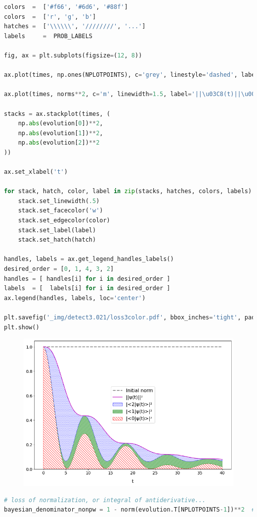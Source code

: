 \begin{lstlisting}[language=Python]
colors  =  ['#f66', '#6d6', '#88f']
colors  =  ['r', 'g', 'b']
hatches =  ['\\\\\\', '////////', '...']
labels     =  PROB_LABELS

fig, ax = plt.subplots(figsize=(12, 8))

ax.plot(times, np.ones(NPLOTPOINTS), c='grey', linestyle='dashed', label='Initial norm', linewidth=2.5)

ax.plot(times, norms**2, c='m', linewidth=1.5, label='||\u03C8(t)||\u00B2')

stacks = ax.stackplot(times, (
    np.abs(evolution[0])**2,
    np.abs(evolution[1])**2,
    np.abs(evolution[2])**2
))

ax.set_xlabel('t')

for stack, hatch, color, label in zip(stacks, hatches, colors, labels):
    stack.set_linewidth(.5)
    stack.set_facecolor('w')
    stack.set_edgecolor(color)
    stack.set_label(label)
    stack.set_hatch(hatch)

handles, labels = ax.get_legend_handles_labels()
desired_order = [0, 1, 4, 3, 2]
handles = [ handles[i] for i in desired_order ]
labels  = [  labels[i] for i in desired_order ]
ax.legend(handles, labels, loc='center')

plt.savefig('_img/detect3.021/loss3color.pdf', bbox_inches='tight', pad_inches=0)
plt.show()
\end{lstlisting}

\begin{figure}[h!]
\centering
\includegraphics[width=0.66\linewidth]{tex/appendix/nb/jupyter/3lev/output_37_0.png}

\end{figure}

\begin{lstlisting}[language=Python]
# loss of normalization, or integral of antiderivative...
bayesian_denominator_nonpw = 1 - norm(evolution.T[NPLOTPOINTS-1])**2  # TODO! explain/replace
\end{lstlisting}

